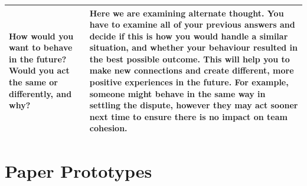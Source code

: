\documentclass{l4proj}
\begin{document}
\begin{appendices}
\begin{center}
\begin{tabular}{ | m{8em} | m{10cm}| }
    \hline
    How would you want to behave in the future? Would you act the same or differently, and why? & Here we are examining alternate thought. You have to examine all of your previous answers and decide if this is how you would handle a similar situation, and whether your behaviour resulted in the best possible outcome. This will help you to make new connections and create different, more positive experiences in the future. For example, someone might behave in the same way in settling the dispute, however they may act sooner next time to ensure there is no impact on team cohesion. \\ [1ex] 
    \hline
   \end{tabular}
   \end{center}



%

\section{Paper Prototypes} \label{Appendix-PaperPrototypes}


\end{appendices}
\end{document}

